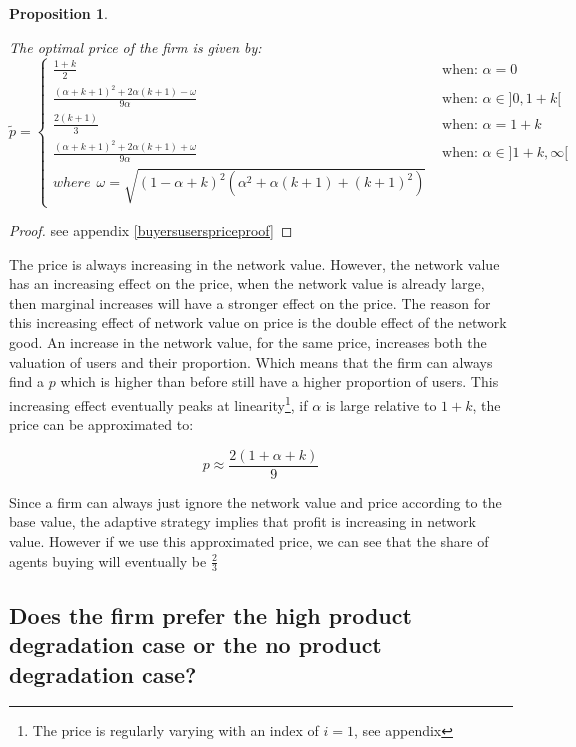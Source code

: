 \documentclass[12pt]{report}
\newtheorem{proposition}{Proposition}
\numberwithin{equation}{section}
\begin{document}
\begin{proposition}
\label{buyersusersprice}

The optimal price of the firm is given by:
\[
\tilde{p}= \left\{
                \begin{array}{ll}
\frac{1+k}{2} ~~~~~~~~~~~~~~~~~~~~~~~~~~~~~~~~~~~~~~~~~~~~~~~~~~~~~~~~~~
&\text{ when: } \alpha = 0
\\
\frac{(\alpha+k+1)^2+2\alpha(k+1) - \omega}{9 \alpha} &\text{ when: } \alpha \in ]0,1+k[
\\
\frac{2(k+1)}{3 }~~~&\text{ when: } \alpha =1+k
                  \\
\frac{(\alpha+k+1)^2+2\alpha(k+1) + \omega}{9 \alpha} &\text{ when: } \alpha \in ]1+k,\infty [ \\
where ~~ \omega = \sqrt{(1-\alpha+k)^2(\alpha^2+\alpha (k+1)+(k+1)^2)} &
 \end{array}
 \right.
\]
\end{proposition}

\begin{proof}
see appendix \ref{buyersuserspriceproof}
\end{proof}

The price is always increasing in the network value. However, the network value has an increasing effect on the price, when the network value is already large, then marginal increases will have a stronger effect on the price. The reason for this increasing effect of network value on price is the double effect of the network good. An increase in the network value, for the same price, increases both the valuation of users and their proportion. Which means that the firm can always find a $p$ which is higher than before still have a higher proportion of users. This increasing effect eventually peaks at linearity\footnote{The price is regularly varying with an index of $i=1$, see appendix}, if $\alpha$ is large relative to $1+k$, the price can be approximated to:

\begin{equation}
p \approx \frac{2(1+\alpha+k)}{9}
\end{equation}


Since a firm can always just ignore the network value and price according to the base value, the adaptive strategy implies that profit is increasing in network value. However if we use this approximated price, we can see that the share of agents buying will eventually be $\frac{2}{3}$

\subsection{Does the firm prefer the high product degradation case or the no product degradation case? }
\end{document}
